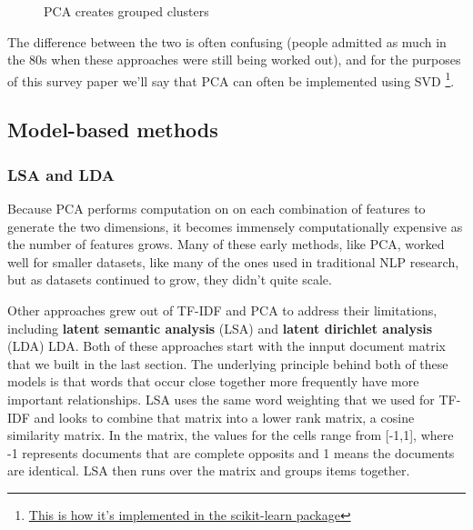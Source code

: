 \documentclass[11pt, table]{diazessay} %
\begin{document}
\begin{sloppypar}
\begin{figure}[H]
        \caption{PCA creates grouped clusters}
      \end{figure}



The difference between the two is often confusing (people admitted as much in the 80s \cite{gerbrands1981relationships} when these approaches were still being worked out), and for the purposes of this survey paper we'll say that PCA can often be implemented using SVD \footnote{\href{https://scikit-learn.org/stable/modules/generated/sklearn.decomposition.PCA.html}{This is how it's implemented in the scikit-learn package}}.  


\subsection{Model-based methods}
\subsubsection{LSA and LDA}

Because PCA performs computation on on each combination of features to generate the two dimensions, it becomes immensely computationally expensive as the number of features grows.  Many of these early methods, like PCA, worked well for smaller datasets, like many of the ones used in traditional NLP research,  but as datasets continued to grow, they didn’t quite scale.  

Other approaches grew out of TF-IDF and PCA to address their limitations, including \textbf{latent semantic analysis} (LSA) and \textbf{latent dirichlet analysis} (LDA) LDA\cite{cvitanic2016lda}.  Both of these approaches start with the innput document matrix that we built in the last section. The underlying principle behind both of these models is that words that occur close together more frequently have more important relationships. LSA uses the same word weighting that we used for TF-IDF and looks to combine that matrix into a lower rank matrix, a cosine similarity matrix. In the matrix, the values for the cells range from [-1,1], where -1 represents documents that are complete opposits and 1 means the documents are identical. LSA then runs over the matrix and groups items together.  


\end{sloppypar}
\end{document}
